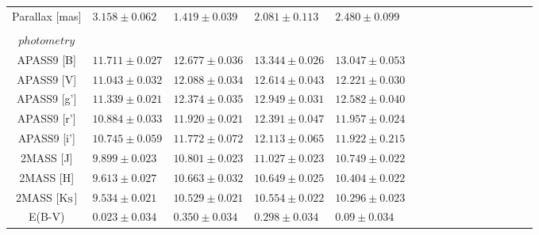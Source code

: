 \begin{table*}
\begin{tabular}{c l l  l l l l l l l l l l l l l }
Parallax [mas]
& $3.158 \pm 0.062$ 
& $1.419 \pm 0.039$
& $2.081 \pm 0.113$
& $2.480 \pm 0.099$ \\ \\

$photometry$ \\
APASS9 [B]   
& $11.711 \pm 0.027$
& $12.677 \pm 0.036$
& $13.344 \pm 0.026$
& $13.047 \pm 0.053$ \\

APASS9 [V]  
& $11.043 \pm 0.032$
& $12.088 \pm 0.034$
& $12.614 \pm 0.043$
& $12.221 \pm 0.030$ \\

APASS9 [g']  
& $11.339 \pm 0.021$
& $12.374 \pm 0.035$
& $12.949 \pm 0.031$
& $12.582 \pm 0.040$ \\

APASS9 [r'] 
& $10.884 \pm 0.033$
& $11.920 \pm 0.021$
& $12.391 \pm 0.047$
& $11.957 \pm 0.024$ \\

APASS9 [i'] 
& $10.745 \pm 0.059$
& $11.772 \pm 0.072$
& $12.113 \pm 0.065$
& $11.922 \pm 0.215$ \\

2MASS [J] 
& $9.899 \pm 0.023$
& $10.801 \pm 0.023$
& $11.027 \pm 0.023$
& $10.749 \pm 0.022$ \\

2MASS [H] 
& $9.613 \pm 0.027$
& $10.663 \pm 0.032$
& $10.649 \pm 0.025$
& $10.404 \pm 0.022$ \\

2MASS [K$_{\rm S}$] 
& $9.534 \pm 0.021$
& $10.529 \pm 0.021$
& $10.554 \pm 0.022$
& $10.296 \pm 0.023$ \\

E(B-V)
& $0.023 \pm 0.034$
& $0.350 \pm 0.034$
& $0.298 \pm 0.034$
& $0.09 \pm 0.034$ \\

\hline


\end{tabular}
\end{table*}
